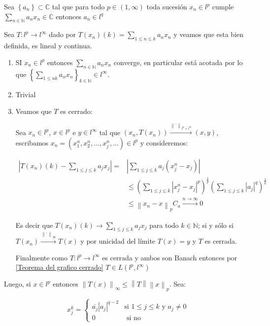 \documentclass[11pt]{article}
\newcommand{\C}{\mathbb{C}}
\newcommand{\N}{{\mathbb{N}}}
\newcommand{\norm}[1]{\left\lVert#1\right\rVert}
\newcommand{\abs}[1]{\left\lvert#1\right\rvert}
\newcommand{\sett}[1]{\left\lbrace#1\right\rbrace}
\newcommand{\Bigsum}[2]{\sum\limits_{#1}{#2}}
\numberwithin{theorem}{subsection}
\newenvironment{proof}[1][Demostraci\'on]{\begin{trivlist}
		\item[\hskip \labelsep {\bfseries #1}]}{\end{trivlist}}
\newenvironment{example}[1][Ejemplo]{\begin{trivlist}
		\item[\hskip \labelsep {\bfseries #1 }]}{\end{trivlist}}
\begin{document}
\begin{example}
	Sea $\sett{a_n} \subset \C$ tal que para todo $p \in \left(1,\infty\right)$ toda sucesi\'on $x_n \in l^p$ cumple $\Bigsum{n \in \N}{a_n x_n} \in \C$ entonces $a_n \in l^q$
\end{example}

\begin{proof}
	Sea $T:l^p \rightarrow l^{\infty}$ dado por $T(x_n)(k) = \Bigsum{1 \leq n \leq k}{a_n x_n}$ y veamos que esta bien definida, es lineal y continua.
	
	\begin{enumerate}
		\item SI $x_n \in l^p$ entonces $\Bigsum{n \in \N}{a_n x_n}$ converge, en particular est\'a acotada por lo que $\sett{\Bigsum{1 \leq n k}{a_n x_n}}_{k \in \N} \in l^{\infty}$.
		\item Trivial
		\item Veamos que $T$ es cerrado:
		
		Sea $x_n \in l^p$, $x \in l^p$ e $y \in l^{\infty}$ tal que $(x_n, T(x_n)) \xrightarrow{\norm{.}_{l^p \times l^{\infty}}} (x,y)$, escribamos $x_n = \left(x_1^n, x_2^n, \dots, x_j^n, \dots\right)\in l^p$ y consideremos:
		
		\[
		\begin{aligned}
			\abs{T(x_n)(k) - \Bigsum{1 \leq j \leq k}{a_j x_j}} = & \abs{\Bigsum{1 \leq j \leq k}{a_j(x_j^n - x_j)}} \\
			& \leq \left(\Bigsum{1 \leq j \leq k}{\abs{x_j^n - x_j}^p}\right)^{\frac{1}{p}} \left(\Bigsum{1 \leq j \leq k}{\abs{a_j}}^q\right)^{\frac{1}{q}} \\
			& \leq \norm{x_n-x}_{p} C_a \xrightarrow{n \rightarrow \infty} 0
		\end{aligned}
		\]
		
		Es decir que $T(x_n)(k) \rightarrow \Bigsum{1 \leq j \leq k}{a_j x_j}$ para todo $k \in \N$; si y s\'olo si $T(x_n) \xrightarrow{\norm{.}_{\infty}} T(x)$ y por unicidad del l\'imite $T(x) = y$ y $T$ es cerrada.
		
		Finalmente como $T:l^p \rightarrow l^{\infty}$ es cerrada y ambos son Banach entonces por \ref{Teorema del grafico cerrado} $T \in L(l^p, l^{\infty})$
		
	\end{enumerate}
	
	Luego, si $x \in l^p$ entonces $\norm{T(x)}_{\infty} \leq \norm{T}\norm{x}_p$. Sea:
	
	\begin{equation*}
		x_j^k  =  \left\lbrace \begin{array}{cc}
									\overline{a_j}\abs{a_j}^{q-2} & \text{si } 1 \leq j \leq k \text{ y } a_j \neq 0 \\
									0 & \text{ si no}
								\end{array} \right.
	\end{equation*}
	

\end{proof}
\end{document}
